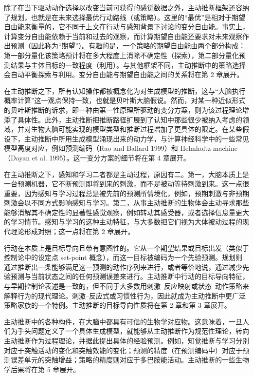 除了在当下驱动动作选择以改变当前可获得的感觉数据之外，主动推断框架还容纳了规划，也就是在未来选择最优行动路线（或策略）。这里的``最优''是相对于期望自由能来衡量的，它不同于上文在行动与感知背景下讨论的变分自由能。事实上，计算变分自由能依赖于当前和过去的观察，而计算期望自由能还要求对未来观察作出预测（因此称为``期望''）。有趣的是，一个策略的期望自由能由两个部分构成：第一部分量化该策略预计将在多大程度上消除不确定性（探索），第二部分量化预测结果与主体目标的一致程度（利用）。与其他框架不同，主动推断中的策略选择会自动平衡探索与利用。变分自由能与期望自由能之间的关系将在第 2 章展开。

在主动推断之下，所有认知操作都被概念化为对生成模型的推断，这与``大脑执行概率计算''这一观点保持一致，也就是贝叶斯大脑假说。然而，对某一种近似形式的贝叶斯推断的诉求，即一种由第一性原理所驱动的变分方案，则为该过程理论增添了具体性。此外，主动推断把推断路径扩展到了认知中那些很少被纳入考虑的领域，并对生物大脑可能实现的模型类型和推断过程增加了更具体的限定。在某些假设下，主动推断中所用生成模型涌现出来的动力学，与计算神经科学中的一些常见模型高度对应，例如预测编码（Rao and Ballard 1999）和 Helmholtz machine（Dayan et al. 1995）。这一变分方案的细节将在第 4 章展开。

在主动推断之下，感知和学习二者都是主动过程，原因有二。第一，大脑本质上是一台预测机器，它不断预测即将到来的刺激，而不是被动等待刺激到来。这一点很重要，因为感知与学习过程总是被先前的预测所情境化，例如，预期刺激与非预期刺激会以不同方式影响感知与学习。第二，从事主动推断的生物体会主动寻求那些能够消解其不确定性的显著性感觉观察，例如转动其感受器，或者选择信息量更大的学习情节。感知与学习的这种主动特征，与大多数把它们视为大体被动过程的现代理论形成对照；这一点将在第 2 章展开。

行动在本质上是目标导向且带有意图性的。它从一个期望结果或目标出发（类似于控制论中的设定点 set-point 概念），而这一目标被编码为一个先验预测。规划则通过推断出一条能够满足这一预测的动作序列来进行，或者等价地说，通过减少先验预测与当前状态之间的任何预测误差来进行。主动推断中行动的目标导向特征，与早期控制论表述是一致的，但不同于大多数用刺激--反应映射或状态--动作策略来解释行为的现代理论。刺激--反应式或习惯性行为，因此就成为主动推断中更广泛策略家族的一个特例。主动推断的目标导向性质将在第 2 章和第 3 章展开。

主动推断中的各种构件，在大脑中都具有可信的生物学对应物。这意味着，一旦人们为手头问题定义了一个具体生成模型，就能够从主动推断作为规范性理论，转向主动推断作为过程理论，并据此提出具体的经验预测。例如，知觉推断与学习分别对应于突触活动的变化和突触效能的变化；预测的精度（在预测编码中）对应于预测误差单元的突触增益；策略的精度则对应于多巴胺能活动。主动推断的一些生物学后果将在第 5 章展开。

